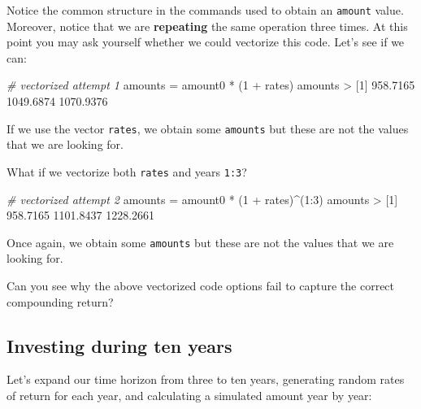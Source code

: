 \documentclass[
]{book}
\newenvironment{Shaded}{\begin{snugshade}}{\end{snugshade}}
\newcommand{\CommentTok}[1]{\textcolor[rgb]{0.56,0.35,0.01}{\textit{#1}}}
\newcommand{\DecValTok}[1]{\textcolor[rgb]{0.00,0.00,0.81}{#1}}
\newcommand{\FloatTok}[1]{\textcolor[rgb]{0.00,0.00,0.81}{#1}}
\newcommand{\NormalTok}[1]{#1}
\newcommand{\OtherTok}[1]{\textcolor[rgb]{0.56,0.35,0.01}{#1}}
\newcommand{\SpecialCharTok}[1]{\textcolor[rgb]{0.00,0.00,0.00}{#1}}
\begin{document}
Notice the common structure in the commands used to obtain an \texttt{amount} value.
Moreover, notice that we are \textbf{repeating} the same operation three times.
At this point you may ask yourself whether we could vectorize this code. Let's
see if we can:

\begin{Shaded}
\begin{Highlighting}[]
\CommentTok{\# vectorized attempt 1}
\NormalTok{amounts }\OtherTok{=}\NormalTok{ amount0 }\SpecialCharTok{*}\NormalTok{ (}\DecValTok{1} \SpecialCharTok{+}\NormalTok{ rates)}
\NormalTok{amounts}
\SpecialCharTok{\textgreater{}}\NormalTok{ [}\DecValTok{1}\NormalTok{]  }\FloatTok{958.7165} \FloatTok{1049.6874} \FloatTok{1070.9376}
\end{Highlighting}
\end{Shaded}

If we use the vector \texttt{rates}, we obtain some \texttt{amounts} but these are not the
values that we are looking for.

What if we vectorize both \texttt{rates} and years \texttt{1:3}?

\begin{Shaded}
\begin{Highlighting}[]
\CommentTok{\# vectorized attempt 2}
\NormalTok{amounts }\OtherTok{=}\NormalTok{ amount0 }\SpecialCharTok{*}\NormalTok{ (}\DecValTok{1} \SpecialCharTok{+}\NormalTok{ rates)}\SpecialCharTok{\^{}}\NormalTok{(}\DecValTok{1}\SpecialCharTok{:}\DecValTok{3}\NormalTok{)}
\NormalTok{amounts}
\SpecialCharTok{\textgreater{}}\NormalTok{ [}\DecValTok{1}\NormalTok{]  }\FloatTok{958.7165} \FloatTok{1101.8437} \FloatTok{1228.2661}
\end{Highlighting}
\end{Shaded}

Once again, we obtain some \texttt{amounts} but these are not the values that we are
looking for.

Can you see why the above vectorized code options fail to capture the correct
compounding return?

\hypertarget{investing-during-ten-years}{%
\subsection{Investing during ten years}\label{investing-during-ten-years}}

Let's expand our time horizon from three to ten years, generating random
rates of return for each year, and calculating a simulated amount year by
year:
\end{document}
